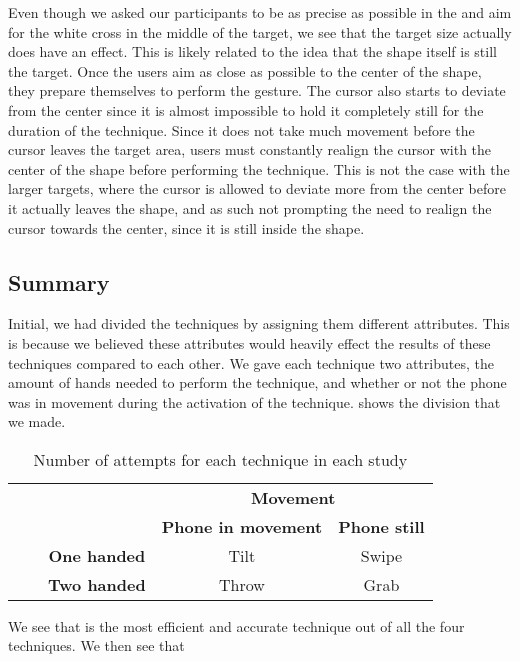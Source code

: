 Even though we asked our participants to be as precise as possible in the \accuracy and aim for the white cross in the middle of the target, we see that the target size actually does have an effect.
This is likely related to the idea that the shape itself is still the target. 
Once the users aim as close as possible to the center of the shape, they prepare themselves to perform the gesture. 
The cursor also starts to deviate from the center since it is almost impossible to hold it completely still for the duration of the technique.
Since it does not take much movement before the cursor leaves the target area, users must constantly realign the cursor with the center of the shape before performing the technique.
This is not the case with the larger targets, where the cursor is allowed to deviate more from the center before it actually leaves the shape, and as such not prompting the need to realign the cursor towards the center, since it is still inside the shape. 

\subsection{Summary}
Initial, we had divided the techniques by assigning them different attributes. 
This is because we believed these attributes would heavily effect the results of these techniques compared to each other.
We gave each technique two attributes, the amount of hands needed to perform the technique, and whether or not the phone was in movement during the activation of the technique.
 shows the division that we made.

\begin{table}[H]
	\centering
	
	\def\arraystretch{1.9}
	\begin{tabular}{c c c c c}
		& & & \multicolumn{2}{c}{\textbf{Movement}} \\
		\cline{4-5}
		& & & \textbf{Phone in movement} & \textbf{Phone still} \\ \cline{3-5}
		\parbox[t]{2mm}{} 
		\parbox[t]{2mm}{}
		& & \textbf{One handed} & Tilt & Swipe \\ 
		& & \textbf{Two handed} & Throw & Grab \\ 
	\end{tabular}
	\caption{Number of attempts for each technique in each study}
	\label{tab:division}
\end{table}


 
We see that \swipe is the most efficient and accurate technique out of all the four techniques.
We then see that \throw 
